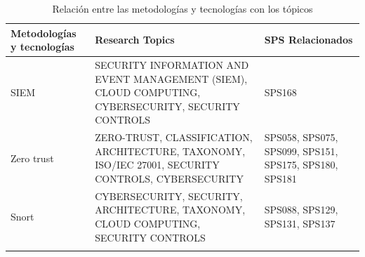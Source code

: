 \begin{table}[htbp]
	\centering
	\renewcommand{\arraystretch}{1}  %
	\begin{tabular}{p{1.5cm}p{3.0cm}p{2cm}}
		\toprule
		\textbf{Metodologías y tecnologías} & \textbf{Research Topics}                 		& \textbf{SPS Relacionados}			  \\
		\midrule
		SIEM                    			& SECURITY INFORMATION AND EVENT MANAGEMENT 
											  (SIEM), CLOUD COMPUTING, CYBERSECURITY, 
											  SECURITY CONTROLS								& SPS168							   \\
		\addlinespace[0.8em]
		\midrule
		Zero trust              			& ZERO-TRUST, CLASSIFICATION, ARCHITECTURE, 
											  TAXONOMY, ISO/IEC 27001, SECURITY CONTROLS, 
											  CYBERSECURITY                                 & SPS058, SPS075, SPS099, SPS151, 
											  												  SPS175, SPS180, SPS181				\\
		\addlinespace[0.8em]
		\midrule
		Snort                   			& CYBERSECURITY, SECURITY, ARCHITECTURE, 
											  TAXONOMY, CLOUD COMPUTING, SECURITY CONTROLS  & SPS088, SPS129, SPS131, SPS137         \\
		\bottomrule
		\vspace{2pt}
	\end{tabular}
	\caption{Relación entre las metodologías y tecnologías con los tópicos}\label{table:topics_metodology_tecnologies}
\end{table}
